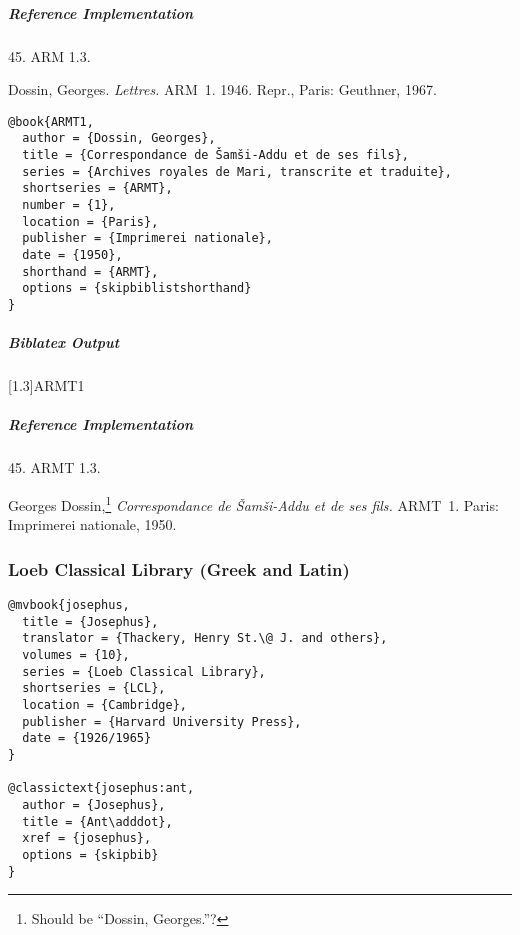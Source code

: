 \documentclass[a4paper]{article}
\newenvironment{biboutput}{%
  \subparagraph{Biblatex Output}
}{\color{black}}
\newenvironment{refimp}{%
  \subparagraph{Reference Implementation}
  \color{reference-colour}
  \rm
}{\par\color{black}}
\begin{document}
\begin{refimp}
  \hspace*{\bibindent}45. ARM 1.3.

  \hangindent\bibindent Dossin, Georges. \emph{Lettres.} ARM~1. 1946. Repr.,
  Paris: Geuthner, 1967.

\end{refimp}

\medskip

\begin{lstlisting}
@book{ARMT1,
  author = {Dossin, Georges},
  title = {Correspondance de Šamši-Addu et de ses fils},
  series = {Archives royales de Mari, transcrite et traduite},
  shortseries = {ARMT},
  number = {1},
  location = {Paris},
  publisher = {Imprimerei nationale},
  date = {1950},
  shorthand = {ARMT},
  options = {skipbiblistshorthand}
}
\end{lstlisting}

\begin{biboutput}
  [1.3]{ARMT1}
\end{biboutput}

\begin{refimp}
  \hspace*{\bibindent}45. ARMT 1.3.

  \hangindent\bibindent Georges Dossin,\footnote{Should be “Dossin,
  Georges.”?} \emph{Correspondance de Šamši-Addu et de ses fils.} ARMT~1.
  Paris: Imprimerei nationale, 1950.

\end{refimp}

\subsubsection{Loeb Classical Library (Greek and Latin)}

\begin{lstlisting}
@mvbook{josephus,
  title = {Josephus},
  translator = {Thackery, Henry St.\@ J. and others},
  volumes = {10},
  series = {Loeb Classical Library},
  shortseries = {LCL},
  location = {Cambridge},
  publisher = {Harvard University Press},
  date = {1926/1965}
}

@classictext{josephus:ant,
  author = {Josephus},
  title = {Ant\adddot},
  xref = {josephus},
  options = {skipbib}
}
\end{lstlisting}
\end{document}
